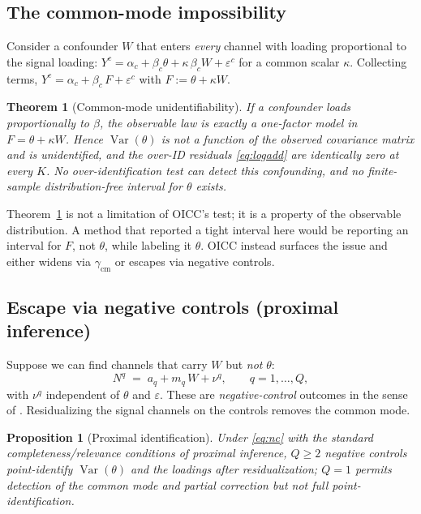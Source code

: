 \documentclass[11pt]{article}
\newtheorem{theorem}{Theorem}
\newtheorem{proposition}{Proposition}
\theoremstyle{definition}
\theoremstyle{remark}
\newcommand{\Var}{\operatorname{Var}}
\newcommand{\eps}{\varepsilon}
\begin{document}
\subsection{The common-mode impossibility}

Consider a confounder $W$ that enters \emph{every} channel with loading
proportional to the signal loading: $Y^c = \alpha_c + \beta_c\theta +
\kappa\,\beta_c W + \eps^c$ for a common scalar $\kappa$. Collecting terms,
$Y^c = \alpha_c + \beta_c\,F + \eps^c$ with $F := \theta + \kappa W$.

\begin{theorem}[Common-mode unidentifiability]\label{thm:impossible}
If a confounder loads proportionally to $\beta$, the observable law is
\emph{exactly} a one-factor model in $F = \theta + \kappa W$. Hence
$\Var(\theta)$ is not a function of the observed covariance matrix and is
unidentified, and the over-ID residuals \eqref{eq:logadd} are identically
zero at every $K$. No over-identification test can detect this confounding,
and no finite-sample distribution-free interval for $\theta$ exists.
\end{theorem}

Theorem~\ref{thm:impossible} is not a limitation of OICC's test; it is a
property of the observable distribution. A method that reported a tight
interval here would be reporting an interval for $F$, not $\theta$, while
labeling it $\theta$. OICC instead surfaces the issue and either widens via
$\gamma_{\text{cm}}$ or escapes via negative controls.

\subsection{Escape via negative controls (proximal inference)}\label{sec:proximal}

Suppose we can find channels that carry $W$ but \emph{not} $\theta$:
\begin{equation}\label{eq:nc}
N^{q} \;=\; a_q + m_q\,W + \nu^{q}, \qquad q=1,\dots,Q,
\end{equation}
with $\nu^q$ independent of $\theta$ and $\eps$. These are
\emph{negative-control} outcomes in the sense of \cite{kurokipearl2014,miao2018}.
Residualizing the signal channels on the controls removes the common mode.

\begin{proposition}[Proximal identification]\label{prop:proximal}
Under \eqref{eq:nc} with the standard completeness/relevance conditions of
proximal inference, $Q \ge 2$ negative controls point-identify
$\Var(\theta)$ and the loadings after residualization; $Q=1$ permits
detection of the common mode and partial correction but not full
point-identification.
\end{proposition}
\end{document}

